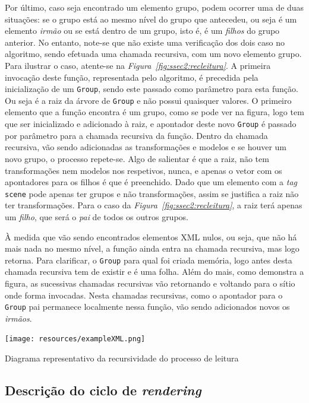 Por último, caso seja encontrado um elemento grupo, podem ocorrer uma de duas
situações: se o grupo está ao mesmo nível do grupo que antecedeu, ou seja é um
elemento \emph{irmão} ou se está dentro de um grupo, isto é, é um \emph{filhos}
do grupo anterior. No entanto, note-se que não existe uma verificação dos dois
caso no algoritmo, sendo efetuada uma chamada recursiva, com um novo elemento
grupo. Para ilustrar o caso, atente-se na
\emph{Figura~\ref{fig:ssec2:recleitura}}. A primeira invocação deste função,
representada pelo algoritmo, é precedida pela inicialização de um
\texttt{Group}, sendo este passado como parâmetro para esta função. Ou seja
é a raiz da árvore de \texttt{Group} e não possui quaisquer valores. O primeiro
elemento que a função encontra é um grupo, como se pode ver na figura, logo tem
que ser inicializado e adicionado à raiz, e apontador deste novo \texttt{Group}
é passado por parâmetro para a chamada recursiva da função. Dentro da chamada
recursiva, vão sendo adicionadas as transformações e modelos e se houver um novo
grupo, o processo repete-se. Algo de salientar é que a raiz, não tem
transformações nem modelos nos respetivos, nunca, e apenas o vetor com os
apontadores para os filhos é que é preenchido. Dado que um elemento com
a \emph{tag} \texttt{scene} pode apenas ter grupos e não transformações, assim
se justifica a raiz não ter transformações. Para o caso da
\emph{Figura~\ref{fig:ssec2:recleitura}}, a raiz terá apenas um \emph{filho},
que será o \emph{pai} de todos os outros grupos.   

À medida que vão sendo encontrados elementos XML nulos, ou seja, que não há mais
nada no mesmo nível, a função ainda entra na chamada recursiva, mas logo
retorna. Para clarificar, o \texttt{Group} para qual foi criada memória, logo
antes desta chamada recursiva tem de existir e é uma folha. Além do mais, como
demonstra a figura, as sucessivas chamadas recursivas vão retornando e voltando
para o sítio onde forma invocadas. Nesta chamadas recursivas, como o apontador
para o \texttt{Group} pai permanece localmente nessa função, vão sendo
adicionados novos os \emph{irmãos}. 

\begin{center}
\texttt{[image: resources/exampleXML.png]}
\captionsetup{type=figure, width=0.8\linewidth}
\caption{Diagrama representativo da recursividade do processo de leitura}
\label{fig:ssec2:recleitura} 
\end{center}


\newpage
\subsection{Descrição do ciclo de \emph{rendering}}



